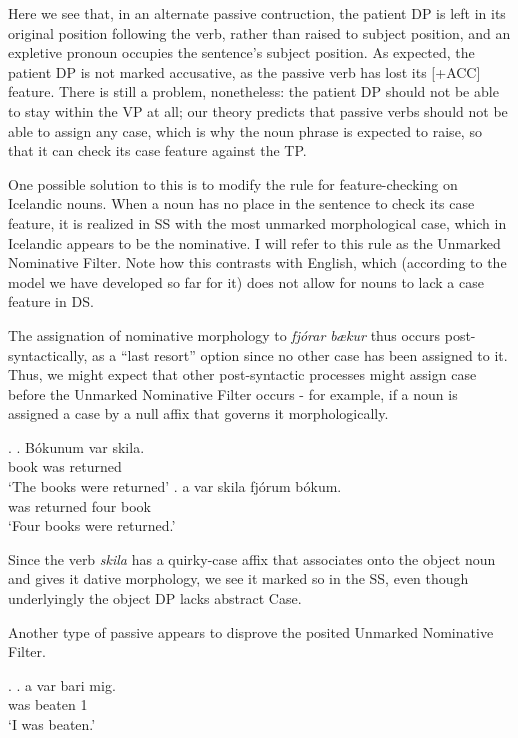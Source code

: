 \documentclass[a4paper, 11pt]{article}
\begin{document}
\begin{enumerate}[label=\textbf{\arabic*.}]
	Here we see that, in an alternate passive contruction, the patient DP is left in its original position following the
	verb, rather than raised to subject position, and an expletive pronoun occupies the sentence's subject position. As
	expected, the patient DP is not marked accusative, as the passive verb has lost its [+ACC] feature. There is still a problem,
	nonetheless: the patient DP should not be able to stay within the VP at all; our theory predicts that passive verbs should
	not be able to assign any case, which is why the noun phrase is expected to raise, so that it can check its case feature
	against the TP.

	One possible solution to this is to modify the rule for feature-checking on Icelandic nouns. When a noun has no place in
	the sentence to check its case feature, it is realized in SS with the most unmarked morphological case, which in Icelandic
	appears to be the nominative. I will refer to this rule as the Unmarked Nominative Filter. Note how this contrasts with
	English, which (according to the model we have developed so far for it) does not allow for nouns to lack a case feature
	in DS.

	The assignation of nominative morphology to \emph{fjórar b\ae kur} thus occurs post-syntactically, as a ``last resort''
	option since no other case has been assigned to it. Thus, we might expect that other post-syntactic processes might
	assign case before the Unmarked Nominative Filter occurs - for example, if a noun is assigned a case by a null affix
	that governs it morphologically.

	\ex.
	\ag.
		Bókunum var skila.\\
		book was returned\\
		\trans `The books were returned'
	\bg.
		\textthorn a var skila fjórum bókum.\\
		  was returned four book\\
		\trans `Four books were returned.'

	Since the verb \emph{skila} has a quirky-case affix that associates onto the object noun and gives it dative morphology,
	we see it marked so in the SS, even though underlyingly the object DP lacks abstract Case.

	Another type of passive appears to disprove the posited Unmarked Nominative Filter.

	\ex.
	\ag.
		\textthorn a var bari mig.\\
		 was beaten 1\\
		\trans `I was beaten.'


\end{enumerate}
\end{document}
